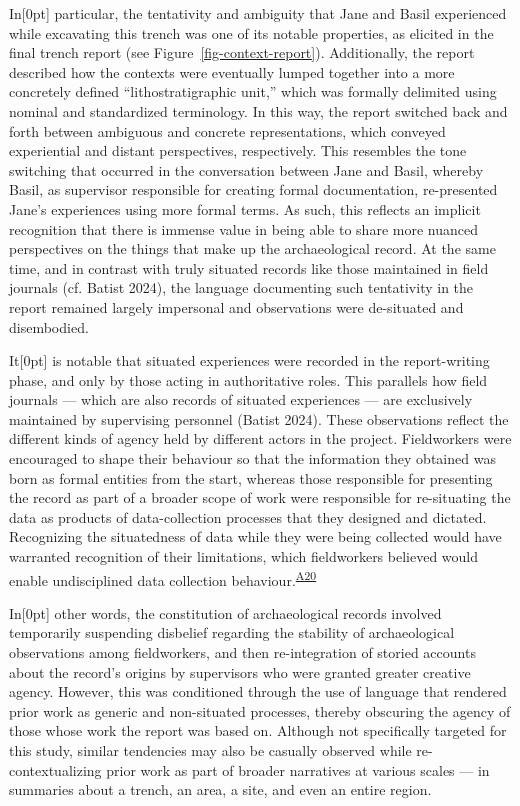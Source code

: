 \documentclass[
]{article}
\newcommand{\paragraphnumber}[1]{\marginnote{\color{lightgray}\tiny{#1}}[0pt]}
\begin{document}
In\paragraphnumber{[40]} particular, the tentativity and ambiguity that
Jane and Basil experienced while excavating this trench was one of its
notable properties, as elicited in the final trench report (see
Figure~\ref{fig-context-report}). Additionally, the report described how
the contexts were eventually lumped together into a more concretely
defined ``lithostratigraphic unit,'' which was formally delimited using
nominal and standardized terminology. In this way, the report switched
back and forth between ambiguous and concrete representations, which
conveyed experiential and distant perspectives, respectively. This
resembles the tone switching that occurred in the conversation between
Jane and Basil, whereby Basil, as supervisor responsible for creating
formal documentation, re-presented Jane's experiences using more formal
terms. As such, this reflects an implicit recognition that there is
immense value in being able to share more nuanced perspectives on the
things that make up the archaeological record. At the same time, and in
contrast with truly situated records like those maintained in field
journals (cf. Batist 2024), the language documenting such tentativity in
the report remained largely impersonal and observations were de-situated
and disembodied.

It\paragraphnumber{[41]} is notable that situated experiences were
recorded in the report-writing phase, and only by those acting in
authoritative roles. This parallels how field journals --- which are
also records of situated experiences --- are exclusively maintained by
supervising personnel (Batist 2024). These observations reflect the
different kinds of agency held by different actors in the project.
Fieldworkers were encouraged to shape their behaviour so that the
information they obtained was born as formal entities from the start,
whereas those responsible for presenting the record as part of a broader
scope of work were responsible for re-situating the data as products of
data-collection processes that they designed and dictated. Recognizing
the situatedness of data while they were being collected would have
warranted recognition of their limitations, which fieldworkers believed
would enable undisciplined data collection
behaviour.\textsuperscript{\hyperref[sec-A20]{A20}}

In\paragraphnumber{[42]} other words, the constitution of archaeological
records involved temporarily suspending disbelief regarding the
stability of archaeological observations among fieldworkers, and then
re-integration of storied accounts about the record's origins by
supervisors who were granted greater creative agency. However, this was
conditioned through the use of language that rendered prior work as
generic and non-situated processes, thereby obscuring the agency of
those whose work the report was based on. Although not specifically
targeted for this study, similar tendencies may also be casually
observed while re-contextualizing prior work as part of broader
narratives at various scales --- in summaries about a trench, an area, a
site, and even an entire region.
\end{document}

